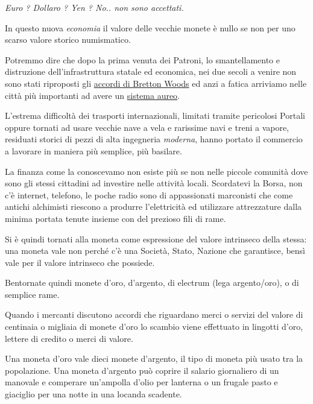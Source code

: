 \begin{multicols}{2}

\label{ricchezza-e-denaro}

\textit{Euro ? Dollaro ? Yen ? No.. non sono accettati.}

In questo nuova \emph{economia} il valore delle vecchie monete è nullo se non per uno scarso valore storico numismatico.

Potremmo dire che dopo la prima venuta dei Patroni, lo smantellamento e distruzione dell'infrastruttura statale ed economica, nei due secoli a venire non sono stati riproposti gli \href{https://it.wikipedia.org/wiki/Accordi_di_Bretton_Woods}{accordi di Bretton Woods} ed anzi a fatica arriviamo nelle città più importanti ad avere un \href{https://it.wikipedia.org/wiki/Sistema_aureo}{sistema aureo}.

L'estrema difficoltà dei trasporti internazionali, limitati tramite pericolosi Portali oppure tornati ad usare vecchie nave a vela e rarissime navi e treni a vapore, residuati storici di pezzi di alta ingegneria \emph{moderna}, hanno portato il commercio a lavorare in maniera più semplice, più basilare.

La finanza come la conoscevamo non esiste più se non nelle piccole comunità dove sono gli stessi cittadini ad investire nelle attività locali. Scordatevi la Borsa, non c'è internet, telefono, le poche radio sono di appassionati marconisti che come antichi alchimisti riescono a produrre l'elettricità ed utilizzare attrezzature dalla minima portata tenute insieme con del prezioso fili di rame.

Si è quindi tornati alla moneta come espressione del valore intrinseco della stessa: una moneta vale non perché c'è una Società, Stato, Nazione che garantisce, bensì vale per il valore intrinseco che possiede.

Bentornate quindi monete d'oro, d'argento, di electrum (lega argento/oro), o di semplice rame.

Quando i mercanti discutono accordi che riguardano merci o servizi del valore di centinaia o migliaia di monete d'oro lo scambio viene effettuato in lingotti d'oro, lettere di credito o merci di valore.

Una moneta d'oro vale dieci monete d'argento, il tipo di moneta più usato tra la popolazione. Una moneta d'argento può coprire il salario giornaliero di un manovale e comperare un'ampolla d'olio per lanterna o un frugale pasto e giaciglio per una notte in una locanda scadente.


\end{multicols}
